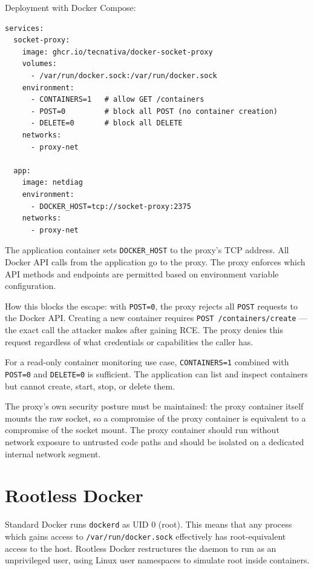 Deployment with Docker Compose:

\begin{lstlisting}
services:
  socket-proxy:
    image: ghcr.io/tecnativa/docker-socket-proxy
    volumes:
      - /var/run/docker.sock:/var/run/docker.sock
    environment:
      - CONTAINERS=1   # allow GET /containers
      - POST=0         # block all POST (no container creation)
      - DELETE=0       # block all DELETE
    networks:
      - proxy-net

  app:
    image: netdiag
    environment:
      - DOCKER_HOST=tcp://socket-proxy:2375
    networks:
      - proxy-net
\end{lstlisting}

The application container sets \texttt{DOCKER\_HOST} to the proxy's TCP address. All Docker API calls from the application go to the proxy. The proxy enforces which API methods and endpoints are permitted based on environment variable configuration.

How this blocks the escape: with \texttt{POST=0}, the proxy rejects all \texttt{POST} requests to the Docker API. Creating a new container requires \texttt{POST /containers/create} --- the exact call the attacker makes after gaining RCE. The proxy denies this request regardless of what credentials or capabilities the caller has.

For a read-only container monitoring use case, \texttt{CONTAINERS=1} combined with \texttt{POST=0} and \texttt{DELETE=0} is sufficient. The application can list and inspect containers but cannot create, start, stop, or delete them.

The proxy's own security posture must be maintained: the proxy container itself mounts the raw socket, so a compromise of the proxy container is equivalent to a compromise of the socket mount. The proxy container should run without network exposure to untrusted code paths and should be isolated on a dedicated internal network segment.


\section{Rootless Docker}

Standard Docker runs \texttt{dockerd} as UID 0 (root). This means that any process which gains access to \texttt{/var/run/docker.sock} effectively has root-equivalent access to the host. Rootless Docker restructures the daemon to run as an unprivileged user, using Linux user namespaces to simulate root inside containers.

